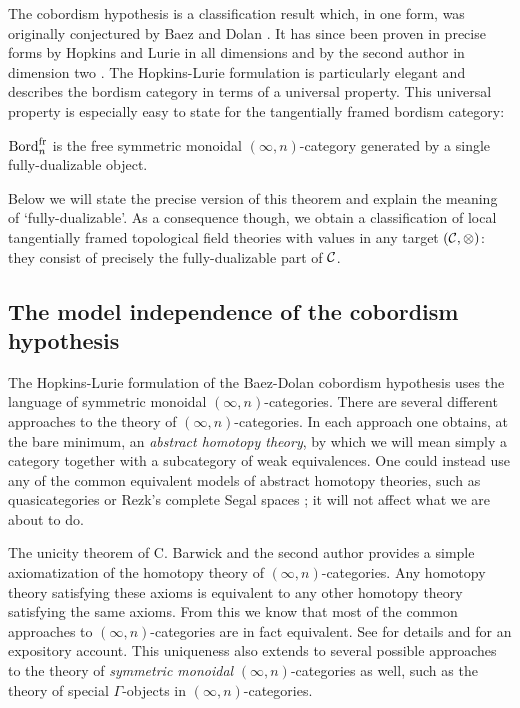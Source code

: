 \documentclass{amsart}
\begin{document}
The cobordism hypothesis is a classification result which, in one form, was originally conjectured by Baez and Dolan \cite{MR1355899}. It has since been proven in precise forms by Hopkins and Lurie \cite{0905.0465} in all dimensions and by the second author in dimension two \cite{schommer-pries-thesis}. The Hopkins-Lurie formulation is particularly elegant and describes the bordism category in terms of a universal property. This universal property is especially easy to state for the tangentially framed bordism category:

\begin{CobHyp}
	$\mathrm{Bord}^\mathrm{fr}_n$ is the free symmetric monoidal $(\infty,n)$-category generated by a single fully-dualizable object. 
\end{CobHyp}

\noindent Below we will state the precise version of this theorem and explain the meaning of `fully-dualizable'. As a consequence though, we obtain a classification of local tangentially framed topological field theories with values in any target $(\mathcal C,\otimes)$: they consist of precisely the fully-dualizable part of $\mathcal C$. 


\subsection{The model independence of the cobordism hypothesis}

The Hopkins-Lurie formulation of the Baez-Dolan cobordism hypothesis uses the language of symmetric monoidal $(\infty,n)$-categories. There are several different approaches to the theory of $(\infty,n)$-categories. In each approach one obtains, at the bare minimum, an {\em abstract homotopy theory}, by which we will mean simply a category together with a subcategory of weak equivalences. %
One could instead use any of the common equivalent models of abstract homotopy theories, such as quasicategories \cite{Joyal_quasicats} or Rezk's complete Segal spaces \cite{Rezk_complete_Segal_Spaces}; it will not affect what we are about to do. 


The unicity theorem of C. Barwick and the second author \cite{Barwick-SP} provides a simple axiomatization of the homotopy theory of $(\infty,n)$-categories. Any homotopy theory satisfying these axioms is equivalent to any other homotopy theory satisfying the same axioms. From this we know that most of the common approaches to $(\infty, n)$-categories are in fact equivalent. See \cite{Barwick-SP} for details and \cite{SP_DLHC_Lectures} for an expository account. This uniqueness also extends to several possible approaches to the theory of {\em symmetric monoidal} $(\infty, n)$-categories as well, such as the theory of special $\Gamma$-objects in $(\infty,n)$-categories. 
\end{document}
